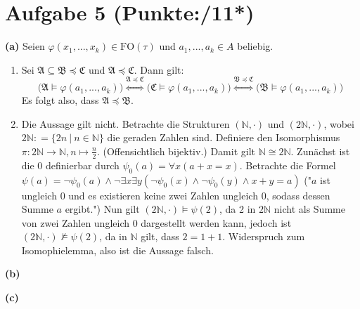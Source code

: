 \documentclass[11pt, a4paper]{article}
\newcommand{\pppp}{11*}
\newcommand{\defgr}{\mathrel{\mathop:\!\!=}}
\newcommand{\struc}[1]{\ensuremath{\mathfrak{#1}}}
\begin{document}
\section*{Aufgabe 5 (Punkte:\qquad/\pppp)}
\textbf{(a)} Seien $\varphi(x_1,...,x_k) \in \text{FO}(\tau)$ und $a_1,...,a_k \in A$ beliebig.
\begin{enumerate}[label=(\roman*)]
\item Sei $\struc{A} \subseteq \struc{B} \preceq \struc{C}$ und $\struc{A} \preceq \struc{C}$. Dann gilt:
	$$\bigg( \struc{A} \models \varphi(a_1,...,a_k) \bigg) \overset{\struc{A} \preceq \struc{C}}{\Leftrightarrow} \bigg( \struc{C} \models \varphi(a_1,...,a_k) \bigg)
	\overset{\struc{B} \preceq \struc{C}}{\Leftrightarrow} \bigg( \struc{B} \models \varphi(a_1,...,a_k) \bigg)$$
Es folgt also, dass $\struc{A} \preceq \struc{B}$.
\item Die Aussage gilt nicht. Betrachte die Strukturen $(\mathbb{N},\cdot)$ und $(2\mathbb{N},\cdot)$, wobei $2\mathbb{N} \defgr \{2n\ |\ n \in \mathbb{N}\}$ die geraden Zahlen sind.
Definiere den Isomorphismus $\pi:2\mathbb{N} \to \mathbb{N}, n \mapsto \frac{n}{2}$. (Offensichtlich bijektiv.) Damit gilt $\mathbb{N} \cong 2\mathbb{N}$.
Zunächst ist die 0 definierbar durch $\psi_0(a)=\forall x(a + x = x)$. Betrachte die Formel $\psi(a)=\neg\psi_0(a) \wedge \neg \exists x \exists y(\neg\psi_0(x) \wedge \neg\psi_0(y) \wedge
x+y=a)$ ("$a$ ist ungleich 0 und es existieren keine zwei Zahlen ungleich 0, sodass dessen Summe $a$ ergibt.") Nun gilt $(2\mathbb{N},\cdot) \models \psi(2)$, da 2 in $2\mathbb{N}$
nicht als Summe von zwei Zahlen ungleich 0 dargestellt werden kann, jedoch ist $(2\mathbb{N},\cdot) \not\models \psi(2)$, da in $\mathbb{N}$ gilt, dass $2=1+1$. Widerspruch zum
Isomophielemma, also ist die Aussage falsch.
\end{enumerate}
\textbf{(b)}
\begin{adjustwidth}{20pt}{20pt}

\end{adjustwidth}
\textbf{(c)}
\begin{adjustwidth}{20pt}{20pt}

\end{adjustwidth}
\end{document}
